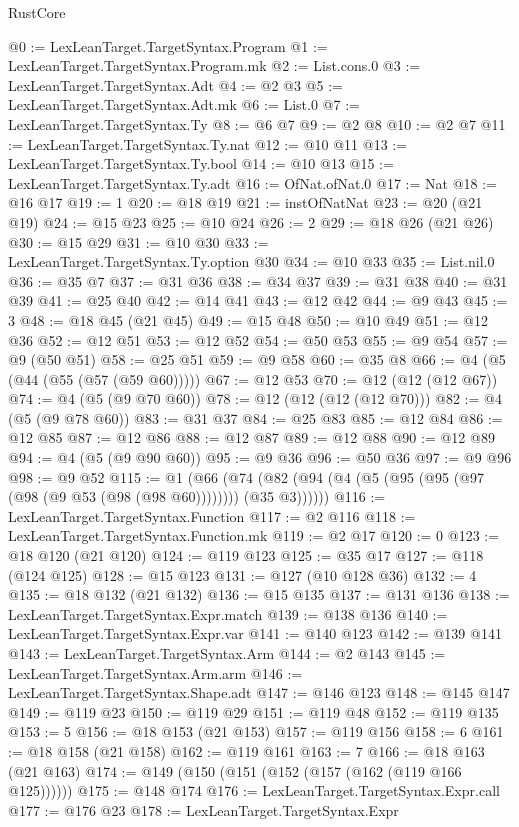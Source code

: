 \begin{lexlean}{RustCore}
\begin{coremodule}
@0 := LexLeanTarget.TargetSyntax.Program
@1 := LexLeanTarget.TargetSyntax.Program.mk
@2 := List.cons.{0}
@3 := LexLeanTarget.TargetSyntax.Adt
@4 := @2 @3
@5 := LexLeanTarget.TargetSyntax.Adt.mk
@6 := List.{0}
@7 := LexLeanTarget.TargetSyntax.Ty
@8 := @6 @7
@9 := @2 @8
@10 := @2 @7
@11 := LexLeanTarget.TargetSyntax.Ty.nat
@12 := @10 @11
@13 := LexLeanTarget.TargetSyntax.Ty.bool
@14 := @10 @13
@15 := LexLeanTarget.TargetSyntax.Ty.adt
@16 := OfNat.ofNat.{0}
@17 := Nat
@18 := @16 @17
@19 := 1
@20 := @18 @19
@21 := instOfNatNat
@23 := @20 (@21 @19)
@24 := @15 @23
@25 := @10 @24
@26 := 2
@29 := @18 @26 (@21 @26)
@30 := @15 @29
@31 := @10 @30
@33 := LexLeanTarget.TargetSyntax.Ty.option @30
@34 := @10 @33
@35 := List.nil.{0}
@36 := @35 @7
@37 := @31 @36
@38 := @34 @37
@39 := @31 @38
@40 := @31 @39
@41 := @25 @40
@42 := @14 @41
@43 := @12 @42
@44 := @9 @43
@45 := 3
@48 := @18 @45 (@21 @45)
@49 := @15 @48
@50 := @10 @49
@51 := @12 @36
@52 := @12 @51
@53 := @12 @52
@54 := @50 @53
@55 := @9 @54
@57 := @9 (@50 @51)
@58 := @25 @51
@59 := @9 @58
@60 := @35 @8
@66 := @4 (@5 (@44 (@55 (@57 (@59 @60)))))
@67 := @12 @53
@70 := @12 (@12 (@12 @67))
@74 := @4 (@5 (@9 @70 @60))
@78 := @12 (@12 (@12 (@12 @70)))
@82 := @4 (@5 (@9 @78 @60))
@83 := @31 @37
@84 := @25 @83
@85 := @12 @84
@86 := @12 @85
@87 := @12 @86
@88 := @12 @87
@89 := @12 @88
@90 := @12 @89
@94 := @4 (@5 (@9 @90 @60))
@95 := @9 @36
@96 := @50 @36
@97 := @9 @96
@98 := @9 @52
@115 := @1
    (@66 (@74 (@82 (@94 (@4 (@5 (@95 (@95 (@97 (@98 (@9 @53 (@98 (@98 @60)))))))) (@35 @3))))))
@116 := LexLeanTarget.TargetSyntax.Function
@117 := @2 @116
@118 := LexLeanTarget.TargetSyntax.Function.mk
@119 := @2 @17
@120 := 0
@123 := @18 @120 (@21 @120)
@124 := @119 @123
@125 := @35 @17
@127 := @118 (@124 @125)
@128 := @15 @123
@131 := @127 (@10 @128 @36)
@132 := 4
@135 := @18 @132 (@21 @132)
@136 := @15 @135
@137 := @131 @136
@138 := LexLeanTarget.TargetSyntax.Expr.match
@139 := @138 @136
@140 := LexLeanTarget.TargetSyntax.Expr.var
@141 := @140 @123
@142 := @139 @141
@143 := LexLeanTarget.TargetSyntax.Arm
@144 := @2 @143
@145 := LexLeanTarget.TargetSyntax.Arm.arm
@146 := LexLeanTarget.TargetSyntax.Shape.adt
@147 := @146 @123
@148 := @145 @147
@149 := @119 @23
@150 := @119 @29
@151 := @119 @48
@152 := @119 @135
@153 := 5
@156 := @18 @153 (@21 @153)
@157 := @119 @156
@158 := 6
@161 := @18 @158 (@21 @158)
@162 := @119 @161
@163 := 7
@166 := @18 @163 (@21 @163)
@174 := @149 (@150 (@151 (@152 (@157 (@162 (@119 @166 @125))))))
@175 := @148 @174
@176 := LexLeanTarget.TargetSyntax.Expr.call
@177 := @176 @23
@178 := LexLeanTarget.TargetSyntax.Expr

\end{coremodule}
\end{lexlean}
